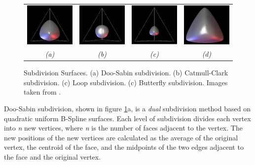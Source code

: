 \begin{figure}
\begin{center}
\begin{tabular}{cccc}
\includegraphics[width=3.18cm]{../images/tetra_doosabin} &
\includegraphics[width=3.18cm]{../images/tetra_catmullclark} &
\includegraphics[width=3.18cm]{../images/tetra_loop} &
\includegraphics[width=3.18cm]{../images/tetra_butterfly} \\
{\it(a)} & {\it(b)} & {\it(c)}  & {\it(d)}
\end{tabular}
\caption[Subdivision Surfaces]{\label{fig:subdivision} Subdivision Surfaces. (a) Doo-Sabin subdivision. (b) Catmull-Clark subdivision. (c) Loop subdivision. (c) Butterfly subdivision. Images taken from \cite{Zorin99}.}
\end{center}
\end{figure}

Doo-Sabin subdivision, shown in figure \ref{fig:subdivision}a, is a {\it dual} subdivision method based on quadratic uniform B-Spline surfaces. Each level of subdivision divides each vertex into {\it n} new vertices, where {\it n} is the number of faces adjacent to the vertex. The new positions of the new vertices are calculated as the average of the original vertex, the centroid of the face, and the midpoints of the two edges adjacent to the face and the original vertex.

